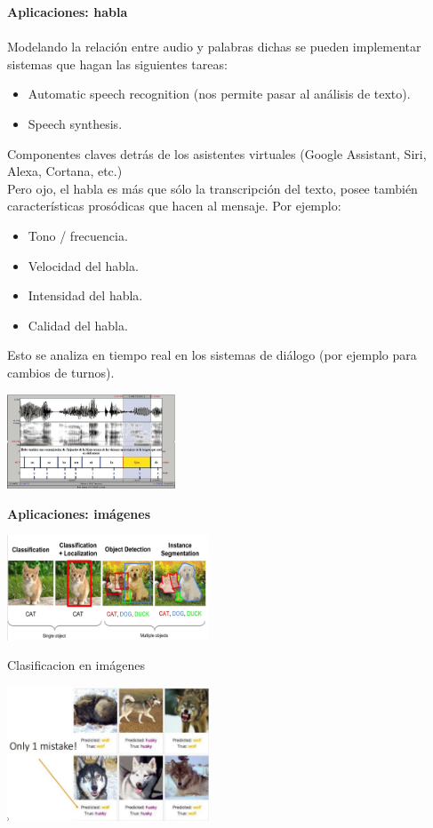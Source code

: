 \documentclass[twoside,twocolumn]{article}
\begin{document}
\textbf{Aplicaciones: habla}\\
\\Modelando la relación entre audio y palabras dichas se pueden implementar sistemas que hagan las siguientes tareas:\\
\begin{itemize}
    \item Automatic speech recognition	(nos permite pasar al análisis de texto).
    \item Speech synthesis.
\end{itemize}
Componentes claves detrás de los asistentes	virtuales (Google Assistant, Siri, Alexa, Cortana, etc.)
\\Pero ojo, el habla es más que sólo la transcripción del texto,  posee también características prosódicas que hacen al  mensaje. Por ejemplo:
\begin{itemize}
    \item Tono / frecuencia.
    \item Velocidad del habla.
    \item Intensidad del habla.
    \item Calidad del habla.
\end{itemize}
Esto se analiza en tiempo real en los sistemas de diálogo (por ejemplo para cambios de turnos).\\
\begin{center}
	\includegraphics[width=5cm]{./img/bd4.png} 
\end{center}

\textbf{Aplicaciones: imágenes}\\
\begin{center}
	\includegraphics[width=6cm]{./img/bd5.png} 
\end{center}
Clasificacion en imágenes
\begin{center}
	\includegraphics[width=6cm]{./img/bd6.png} 
\end{center}
\end{document}
